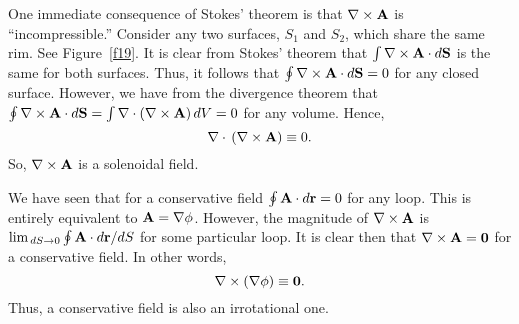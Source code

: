 One immediate consequence of  Stokes' theorem is that $\nabla\times{\bf A}$
is ``incompressible.''  Consider any two surfaces, $S_1$ and $S_2$, which share the
same rim. See Figure~\ref{f19}. It is clear from Stokes' theorem that 
$\int \nabla\times {\bf A}\cdot d{\bf S}$ is the same for both surfaces. Thus, it
follows that $\oint\nabla\times {\bf A}\cdot d{\bf S} = 0$ for any closed surface.
However, we have from the divergence theorem that
$\oint\nabla\times{\bf A}\cdot d{\bf S} = \int \nabla\cdot(\nabla\times{\bf A}) \,dV
=0$
 for any volume. Hence,
\begin{equation}
\nabla\cdot\,(\nabla\times{\bf A}) \equiv 0.
\end{equation}
So,
$\nabla\times {\bf A}$ is a solenoidal field. 

We have seen that for a conservative field $\oint {\bf A}\cdot d{\bf r} = 0$
for any loop. This  is entirely equivalent to ${\bf A} = \nabla\phi$. 
However, the magnitude of $\nabla\times{\bf A}$ is 
$\lim_{\,dS\rightarrow 0}\oint{\bf A}\cdot d{\bf r} /dS$ for some
particular loop. It is clear then that
$\nabla\times{\bf A}={\bf 0}$ for a conservative field. In other words,
\begin{equation}
\nabla\times(\nabla\phi)\equiv {\bf 0}.
\end{equation}
Thus, a conservative field is also an irrotational one. 

